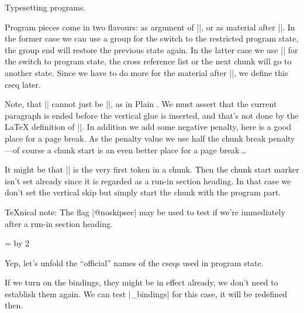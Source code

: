 \documentclass{progltx}
\begin{document}
\chap Typesetting programs.

Program pieces come in two flavours: as argument of |\PB|, or as
material after |\B|. In the former case we can use a group for the
switch to the restricted program state, the group end will restore the
previous state again. In the latter case we use |\B| for the switch to
program state, the cross reference list or the next chunk will go to
another state. Since we have to do more for the material after |\B|,
we define this cseq later.

\beginprog
\def\PB#1{%
    \begingroup
	\cwbb@Rprogram
	\leavevmode
	#1%
    \endgroup
    }
\endprog


\sect Note, that |\Y| cannot just be |\smallskip|, as in Plain
\cweb{}. We must assert that the current paragraph is ended before the
vertical glue is inserted, and that's not done by the \LaTeX{}
definition of |\smallskip|. In addition we add some negative penalty,
here is a good place for a page break. As the penalty value we use
half the chunk break penalty---of course a chunk start is an even
better place for a page break\,\dots

It might be that |\Y| is the very first token in a chunk. Then the
chunk start marker isn't set already since it is regarded as a run-in
section heading. In that case we don't set the vertical skip but
simply start the chunk with the program part.

\TeX{}nical note: The flag |@noskipsec| may be used to test if we're
immediately after a run-in section heading.

\beginprog
\newcount\CwebProgPenalty
	\CwebProgPenalty=\@secpenalty
	\divide\CwebProgPenalty by 2
\def\Y{%
    \if@noskipsec
    \else
	\par
	\penalty\CwebProgPenalty
	\smallskip
    \fi
    }
\endprog


\sect Yep, let's unfold the ``official'' names of the cseqs used in
program state.

If we turn on the \cweave{} bindings, they might be in effect already,
we don't need to establish them again. We can test
|\cwbb@user_bindings| for this case, it will be redefined then.
\end{document}
